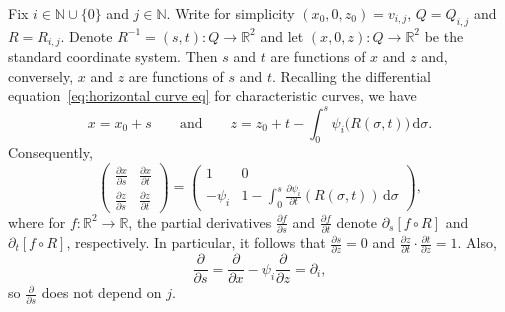 \documentclass[11pt,reqno]{amsart}
\newcommand{\N}{\mathbb{N}}
\newcommand{\R}{\mathbb{R}}
\newcommand{\ud}[0]{\,\mathrm{d}}
\newcommand{\0}{\mathbf{0}}
\renewcommand{\1}{\mathbf 1}
\newcommand{\from}{\colon}
\theoremstyle{remark}
\newcommand{\pd}[2]{\frac{\partial #2}{\partial #1}}
\begin{document}
Fix  $i\in \N\cup \{0\}$ and $j\in \N$. Write for simplicity $(x_0,0,z_0)=v_{i,j}$, $Q=Q_{i,j}$ and $R=R_{i,j}$. Denote $R^{-1}=(s,t)\from Q\to \R^2$ and let $(x,0,z)\from Q\to \R^2$ be the standard coordinate system. Then $s$ and $t$ are functions of $x$ and $z$ and, conversely, $x$ and $z$ are functions of $s$ and $t$. Recalling the differential equation~\eqref{eq:horizontal curve eq} for characteristic curves, we have
$$
x=x_0+s\qquad\mathrm{and}\qquad z=z_0+t-\int_0^s \psi_i\big(R(\sigma,t)\big)\ud \sigma.
$$
Consequently,
\begin{equation}\label{eq:partials st xy}
  \begin{pmatrix}
    \pd{s}{x} & \pd{t}{x} \\
    \pd{s}{z} & \pd{t}{z}
  \end{pmatrix}=\begin{pmatrix}
    1 &  0 \\
    -\psi_i & 1-\int_0^s \frac{\partial \psi_i}{\partial t} (R(\sigma, t)) \ud \sigma
  \end{pmatrix},
\end{equation}
where for $f\from \R^2\to \R$, the partial derivatives $\pd{s}{f}$ and $\pd{t}{f}$ denote $\partial_s[f\circ R]$ and $\partial_t[f\circ R]$, respectively.
In particular, it follows that $\frac{\partial s}{\partial z}=0$ and $\frac{\partial z}{\partial t}\cdot \frac{\partial t}{\partial z}=1$.  Also,
\begin{equation}\label{eq:partial-s is nabla-i}
  \frac{\partial}{\partial s}=\frac{\partial}{\partial x}-\psi_i \frac{\partial}{\partial z}=\partial_i,
\end{equation}
so $\frac{\partial}{\partial s}$ does not depend on $j$.
\end{document}
